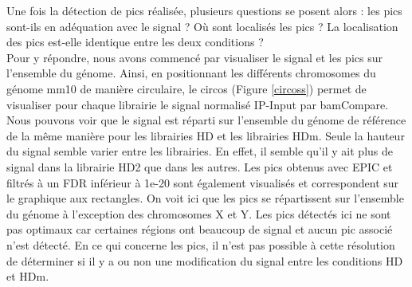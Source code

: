 \documentclass[a4paper,12pt,times]{report}
\begin{document}
 \bigskip
Une fois la détection de pics réalisée, plusieurs questions se posent alors :  les pics sont-ils en adéquation avec le signal ? Où sont localisés les pics ? La localisation des pics est-elle identique entre les deux conditions ? \\
Pour y répondre, nous avons commencé par visualiser le signal et les pics sur l'ensemble du génome.
   Ainsi, en positionnant les différents chromosomes du génome mm10 de manière circulaire, le circos (Figure \ref{circoss}) permet de visualiser pour chaque librairie le signal normalisé IP-Input par bamCompare.
  \newline Nous pouvons voir que le signal est réparti sur l'ensemble du génome de référence de la même manière pour les librairies HD et les librairies HDm. Seule la hauteur du signal semble varier entre les librairies. En effet, il semble qu'il y ait plus de signal dans la librairie HD2 que dans les autres. 
   \newline  Les pics obtenus avec EPIC et filtrés à un FDR inférieur à 1e-20 sont également visualisés et correspondent sur le graphique aux rectangles. On voit ici que les pics se répartissent sur l'ensemble du génome à l'exception des chromosomes X et Y.  Les pics détectés ici ne sont pas optimaux car certaines régions ont beaucoup de signal et aucun pic associé n'est détecté. En ce qui concerne les pics, il n'est pas possible à cette résolution de déterminer si il y a ou non une modification du signal entre les conditions HD et HDm.
\end{document}
